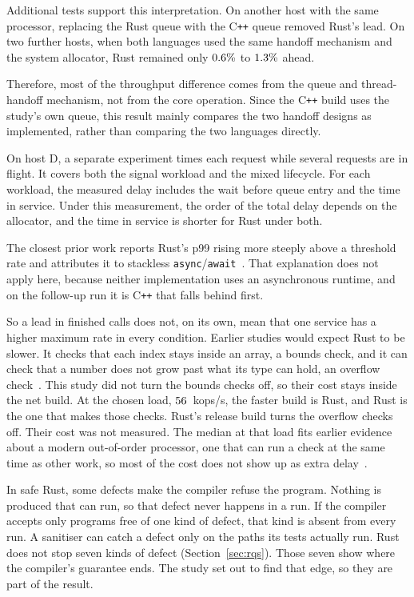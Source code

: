 \documentclass[english,oneside,a4paper,censored,csm,software-track-2020]{HYthesisML}
\begin{document}
Additional tests support this interpretation. On another host with the same
processor, replacing the Rust queue with the C\texttt{++} queue removed Rust's
lead. On two further hosts, when both languages used the same handoff mechanism
and the system allocator, Rust remained only $0.6\%$ to
$1.3\%$ ahead.

Therefore, most of the throughput difference comes from the queue and
thread-handoff mechanism, not from the core operation. Since the C\texttt{++}
build uses the study's own queue, this result mainly compares the two handoff
designs as implemented, rather than comparing the two languages directly.

On host D, a separate experiment times each request while several requests
are in flight. It covers both the signal workload and the mixed lifecycle. For
each workload, the measured delay includes the wait before queue entry and the
time in service. Under this measurement, the order of the total delay depends on the
allocator, and the time in service is shorter for Rust under both.

The closest prior work reports Rust's p99 rising more steeply above a threshold
rate and attributes it to stackless
\texttt{async}/\texttt{await}~\cite{arvidsson2025async}. That explanation does
not apply here, because neither implementation uses an asynchronous runtime, and
on the follow-up run it is C\texttt{++} that falls behind first.

So a lead in finished calls does not, on its own, mean that one service has a
higher maximum rate in every condition. Earlier studies would expect Rust to be
slower. It checks that each index stays inside an array, a bounds check, and it
can check that a number does not grow past what its type can hold, an overflow
check~\cite{zhang2022runtime,harris2023morello}. This study did not turn the bounds checks off, so their cost stays inside the net build. At the chosen load, $56$~kops/s, the
faster build is Rust, and Rust is the one that makes those checks. Rust's
release build turns the overflow checks off. Their cost was not measured. The
median at that load fits earlier evidence about a modern out-of-order processor,
one that can run a check at the same time as other work, so most of the cost
does not show up as extra delay~\cite{balasubramanian2017rust,emmerich2019drivers}.

In safe Rust, some defects make the compiler refuse the program. Nothing is
produced that can run, so that defect never happens in a run. If the compiler
accepts only programs free of one kind of defect, that kind is absent from every
run. A sanitiser can catch a defect only on the paths its tests actually run.
Rust does not stop seven kinds of defect (Section~\ref{sec:rqs}). Those seven
show where the compiler's guarantee ends. The study set out to find that edge,
so they are part of the result.
\end{document}

